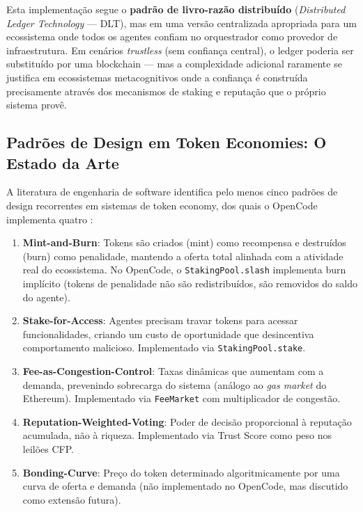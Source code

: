 Esta implementação segue o \textbf{padrão de livro-razão distribuído} (\textit{Distributed Ledger Technology} --- DLT), mas em uma versão centralizada apropriada para um ecossistema onde todos os agentes confiam no orquestrador como provedor de infraestrutura. Em cenários \textit{trustless} (sem confiança central), o ledger poderia ser substituído por uma blockchain --- mas a complexidade adicional raramente se justifica em ecossistemas metacognitivos onde a confiança é construída precisamente através dos mecanismos de staking e reputação que o próprio sistema provê.

\subsection{Padrões de Design em Token Economies: O Estado da Arte}

A literatura de engenharia de software identifica pelo menos cinco padrões de design recorrentes em sistemas de token economy, dos quais o OpenCode implementa quatro \cite{xu2016taxonomy, frantzeskakis2021engineering}:

\begin{enumerate}
    \item \textbf{Mint-and-Burn}: Tokens são criados (mint) como recompensa e destruídos (burn) como penalidade, mantendo a oferta total alinhada com a atividade real do ecossistema. No OpenCode, o \texttt{StakingPool.slash} implementa burn implícito (tokens de penalidade não são redistribuídos, são removidos do saldo do agente).
    
    \item \textbf{Stake-for-Access}: Agentes precisam travar tokens para acessar funcionalidades, criando um custo de oportunidade que desincentiva comportamento malicioso. Implementado via \texttt{StakingPool.stake}.
    
    \item \textbf{Fee-as-Congestion-Control}: Taxas dinâmicas que aumentam com a demanda, prevenindo sobrecarga do sistema (análogo ao \textit{gas market} do Ethereum). Implementado via \texttt{FeeMarket} com multiplicador de congestão.
    
    \item \textbf{Reputation-Weighted-Voting}: Poder de decisão proporcional à reputação acumulada, não à riqueza. Implementado via Trust Score como peso nos leilões CFP.
    
    \item \textbf{Bonding-Curve}: Preço do token determinado algoritmicamente por uma curva de oferta e demanda (não implementado no OpenCode, mas discutido como extensão futura).
\end{enumerate}


